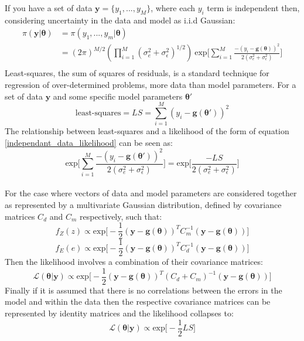 If you have a set of data $\bm{y} = \{y_1,...,y_M\}$, where each $y_i$ term is independent then, considering uncertainty in the data and model as i.i.d Gaussian:
\begin{equation}
\begin{split}
\pi(\bm{y}|\bm{\theta}) &= \pi(y_1,...,y_m|\bm{\theta})\\
&= (2\pi)^{M/2}(\prod_{i = 1}^{M}(\sigma_{e}^2+\sigma_{\epsilon}^2)^{1/2})\ \text{exp}\bigg[\sum_{i = 1}^{M}\frac{-(y_i-\bm{g}({\bm{\theta}}))^2}{2(\sigma_{e}^2+\sigma_{\epsilon}^2)}\bigg]\\
\label{independant_data_likelihood}
\end{split}
\end{equation}
Least-squares, the sum of squares of residuals, is a standard technique for regression of over-determined problems, more data than model parameters. For a set of data $\bm{y}$ and some specific model parameters $\bm{\theta'}$
\begin{equation}
\text{least-squares} = LS = \sum_{i = 1}^{M} (y_i - \bm{g}(\bm{\theta'}))^2
\end{equation}
The relationship between least-squares and a likelihood of the form of equation \ref{independant_data_likelihood} can be seen as:
\begin{equation}
\text{exp}\bigg[\sum_{i = 1}^{M}\frac{-(y_i-\bm{g}({\bm{\theta'}}))^2}{2(\sigma_{e}^2+\sigma_{\epsilon}^2)}\bigg] = \text{exp}\bigg[\frac{-LS}{2(\sigma_{e}^2+\sigma_{\epsilon}^2)}\bigg]
\end{equation}\\

For the case where vectors of data and model parameters are considered together as represented by a multivariate Gaussian distribution, defined by covariance matrices $C_d$ and $C_m$ respectively, such that:
\begin{equation}
f_Z(z) \propto \text{exp}\bigg[-\frac{1}{2}(\bm{y}-\bm{g}(\bm{\theta}))^TC_m^{-1}(\bm{y}-\bm{g}(\bm{\theta}))\bigg]
\end{equation}
\begin{equation}
f_E(e) \propto \text{exp}\bigg[-\frac{1}{2}(\bm{y}-\bm{g}(\bm{\theta}))^TC_d^{-1}(\bm{y}-\bm{g}(\bm{\theta}))\bigg]
\end{equation}
Then the likelihood involves a combination of their covariance matrices:
\begin{equation}
\mathcal{L}(\bm{\theta}|\bm{y}) \propto \text{exp}\bigg[-\frac{1}{2}(\bm{y}-\bm{g}(\bm{\theta}))^T(C_d+C_m)^{-1}(\bm{y}-\bm{g}(\bm{\theta}))\bigg]
\end{equation}
Finally if it is assumed that there is no correlations between the errors in the model and within the data then the respective covariance matrices can be represented by identity matrices and the likelihood collapses to:
\begin{equation}
\mathcal{L}(\bm{\theta}|\bm{y}) \propto \text{exp}\bigg[-\frac{1}{2}LS\bigg]
\end{equation}

